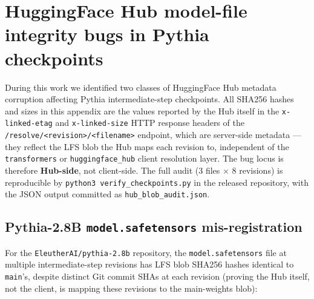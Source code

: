 \documentclass[10pt]{article}
\begin{document}
\section{HuggingFace Hub model-file integrity bugs in Pythia checkpoints}
\label{app:hub}

During this work we identified two classes of HuggingFace Hub
metadata corruption affecting Pythia intermediate-step checkpoints.
All SHA256 hashes and sizes in this appendix are the values reported
by the Hub itself in the \texttt{x-linked-etag} and
\texttt{x-linked-size} HTTP response headers of the
\texttt{/resolve/<revision>/<filename>} endpoint, which are
server-side metadata --- they reflect the LFS blob the Hub maps each
revision to, independent of the \texttt{transformers} or
\texttt{huggingface\_hub} client resolution layer. The bug locus is
therefore \textbf{Hub-side}, not client-side. The full audit (3
files $\times$ 8 revisions) is reproducible by
\texttt{python3 verify\_checkpoints.py} in the released repository,
with the JSON output committed as \texttt{hub\_blob\_audit.json}.

\subsection{Pythia-2.8B \texttt{model.safetensors} mis-registration}

For the \verb|EleutherAI/pythia-2.8b| repository, the
\verb|model.safetensors| file at multiple intermediate-step revisions
has LFS blob SHA256 hashes identical to \verb|main|'s, despite
distinct Git commit SHAs at each revision (proving the Hub itself,
not the client, is mapping these revisions to the
main-weights blob):
\end{document}
